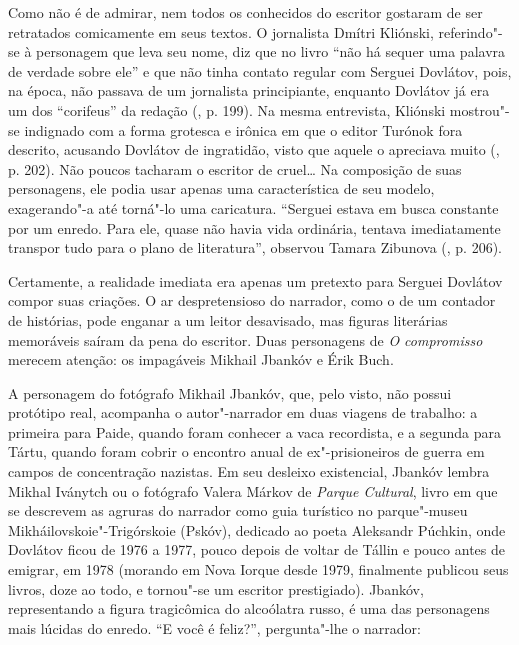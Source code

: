Como não é de admirar, nem todos os conhecidos do escritor gostaram de
ser retratados comicamente em seus textos. O jornalista Dmítri Kliónski,
referindo"-se à personagem que leva seu nome, diz que no livro ``não há
sequer uma palavra de verdade sobre ele'' e que não tinha contato
regular com Serguei Dovlátov, pois, na época, não passava de um
jornalista principiante, enquanto Dovlátov já era um dos ``corifeus'' da
redação (, p. 199). Na mesma entrevista, Kliónski mostrou"-se
indignado com a forma grotesca e irônica em que o editor Turónok fora
descrito, acusando Dovlátov de ingratidão, visto que aquele o apreciava
muito (, p. 202). Não poucos tacharam o escritor de cruel\ldots{} Na
composição de suas personagens, ele podia usar apenas uma característica
de seu modelo, exagerando"-a até torná"-lo uma caricatura. ``Serguei
estava em busca constante por um enredo. Para ele, quase não havia vida
ordinária, tentava imediatamente transpor tudo para o plano de
literatura'', observou Tamara Zibunova (, p. 206).

\begin{center}
{}
\end{center}

Certamente, a realidade imediata era apenas um pretexto para Serguei
Dovlátov compor suas criações. O ar despretensioso do narrador, como o
de um contador de histórias, pode enganar a um leitor desavisado, mas
figuras literárias memoráveis saíram da pena do escritor. Duas
personagens de \emph{O compromisso} merecem atenção: os impagáveis
Mikhail Jbankóv e Érik Buch.

A personagem do fotógrafo Mikhail Jbankóv, que, pelo visto, não possui
protótipo real, acompanha o autor"-narrador em duas viagens de trabalho:
a primeira para Paide, quando foram conhecer a vaca recordista, e a
segunda para Tártu, quando foram cobrir o encontro anual de
ex"-prisioneiros de guerra em campos de concentração nazistas. Em seu
desleixo existencial, Jbankóv lembra Mikhal Iványtch ou o fotógrafo
Valera Márkov de \emph{Parque Cultural}, livro em que se descrevem as
agruras do narrador como guia turístico no parque"-museu
Mikháilovskoie"-Trigórskoie (Pskóv), dedicado ao poeta Aleksandr Púchkin, onde
Dovlátov ficou de 1976 a 1977, pouco depois de voltar de Tállin e pouco
antes de emigrar, em 1978 (morando em Nova Iorque desde 1979, finalmente
publicou seus livros, doze ao todo, e tornou"-se um escritor
prestigiado). Jbankóv, representando a figura tragicômica do alcoólatra
russo, é uma das personagens mais lúcidas do enredo. ``E você é feliz?'',
pergunta"-lhe o narrador:


